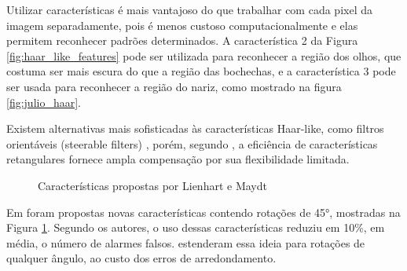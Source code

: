 Utilizar características é mais vantajoso do que trabalhar com cada pixel da imagem separadamente, pois é menos custoso computacionalmente e elas permitem reconhecer padrões determinados. A característica 2 da Figura \ref{fig:haar_like_features} pode ser utilizada para reconhecer a região dos olhos, que costuma ser mais escura do que a região das bochechas, e a característica 3 pode ser usada para reconhecer a região do nariz, como mostrado na figura \ref{fig:julio_haar}.

Existem alternativas mais sofisticadas às características Haar-like, como filtros orientáveis (steerable filters) \cite{freeman1991design} \cite{greenspan1994overcomplete}, porém, segundo \citet{Viola01rapidobject}, a eficiência de características retangulares fornece ampla compensação por sua flexibilidade limitada.

\begin{figure}[htbp]
   \begin{center}
   \end{center}
   \caption{Características propostas por Lienhart e Maydt \label{lienhart_haar_features}}
\end{figure}

Em \citet{lienhart2002extended} foram propostas novas características contendo rotações de \ang{45}, mostradas na Figura \ref{lienhart_haar_features}. Segundo os autores, o uso dessas características reduziu em 10\%, em média, o número de alarmes falsos. \citet{messom2009stream} estenderam essa ideia para rotações de qualquer ângulo, ao custo dos erros de arredondamento.


